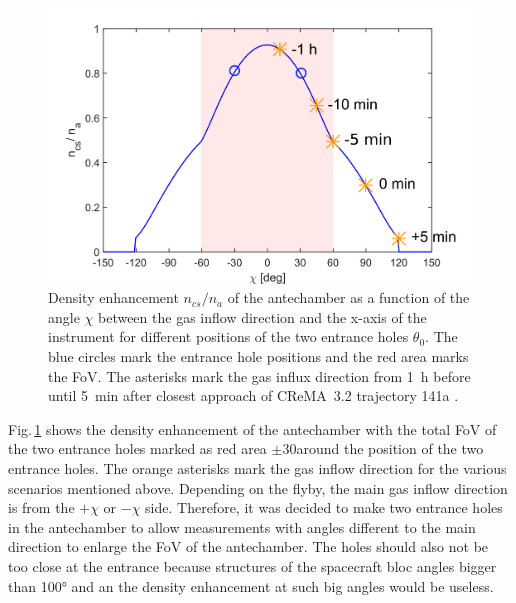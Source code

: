 	\begin{figure}[h!]
		\centering
		\includegraphics[width=.8\textwidth]{Bilder/Chi_theta0_flyby.png}
		\caption{Density enhancement $n_{cs}/n_a$ of the antechamber as a function of the angle $\chi$ between the gas inflow direction and the x-axis of the instrument for different positions of the two entrance holes $\theta_0$. The blue circles mark the entrance hole positions and the red area marks the FoV. The asterisks mark the gas influx direction from 1~h before until 5~min after closest approach of CReMA~3.2 trajectory 141a \cite{SOC_Crema3p2}.}
		\label{fig:densEnhChiFlyby}
	\end{figure}
	Fig.\,\ref{fig:densEnhChiFlyby} shows the density enhancement of the antechamber with the total FoV of the two entrance holes marked as red area $\pm$30\degree around the position of the two entrance holes. The orange asterisks mark the gas inflow direction for the various scenarios mentioned above. Depending on the flyby, the main gas inflow direction is from the $+\chi$ or $-\chi$ side. Therefore, it was decided to make two entrance holes in the antechamber to allow measurements with angles different to the main direction to enlarge the FoV of the antechamber. The holes should also not be too close at the entrance because structures of the spacecraft bloc angles bigger than 100° and an the density enhancement at such big angles would be useless.
	
	
